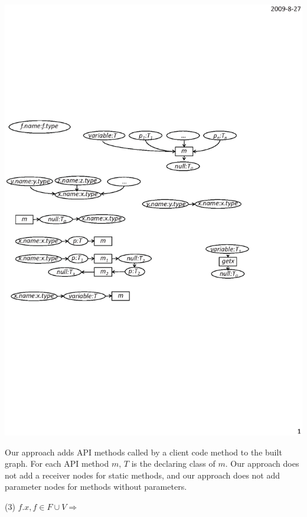 \begin{center}
\includegraphics[scale=0.7,clip]{figure/rule2.eps}%
\end{center}


Our approach adds API methods called by a client code method to the
built graph. For each API method $m$, $T$ is the declaring class of
$m$. Our approach does not add a receiver nodes for static methods,
and our approach does not add parameter nodes for methods without
parameters.

(3) $f.x, f\in F\cup V\Rightarrow $

